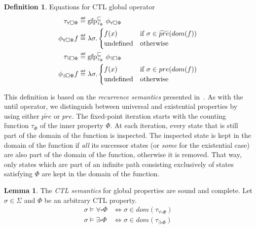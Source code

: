 \documentclass[11pt,a4paper,titlepage]{article}
\theoremstyle{definition}
\newtheorem{definition}{Definition}[section]
\newtheorem{lemma}[theorem]{Lemma}
\newcommand\eqdef{\mathrel{\overset{\makebox[0pt]{\mbox{\normalfont\tiny\sffamily def}}}{=}}}
\begin{document}
\begin{definition}\label{def:ctl_semantics_global}
    Equations for CTL global operator
    \setlength{\jot}{15pt}
    \begin{align}
        \tau_{\forall\square\Phi} &\eqdef \text{gfp}_{\tau_\Phi}^{\sqsubseteq} \  \phi_{\forall\square\Phi}\\
        \phi_{\forall\square\Phi}f &\eqdef \lambda \sigma.
        \begin{cases}
            f(x)                            & \text{if} \ \sigma \in \widetilde{pre}(dom(f)) \\
            \text{undefined}                & \text{otherwise}
        \end{cases}\\
        \tau_{\exists\square\Phi} &\eqdef \text{gfp}_{\tau_\Phi}^{\sqsubseteq} \  \phi_{\exists\square\Phi}\\
        \phi_{\exists\square\Phi}f &\eqdef \lambda \sigma.
        \begin{cases}
            f(x)                            & \text{if} \ \sigma \in pre(dom(f)) \\
            \text{undefined}                & \text{otherwise}
        \end{cases}
    \end{align}
\end{definition}

This definition is based on the \textit{recurrence semantics} presented in~\cite{UrbanM-VMCAI15}.
As with the \textsf{until} operator, we distinguish between universal and existential properties by using either $\widetilde{pre}$ or $pre$. 
The fixed-point iteration starts with the counting function $\tau_\Phi$ of the inner property $\Phi$.
At each iteration, every state that is still part of the domain of the function is inspected. 
The inspected state is kept in the domain of the function if \textit{all} its successor states 
(or \textit{some} for the existential case) are also part of the domain of the function, otherwise it is removed.
That way, only states which are part of an infinite path consisting exclusively of states satisfying $\Phi$ are kept in 
the domain of the function.

\begin{lemma}\label{lem:ctl_semantics_global}
    The \textit{CTL semantics} for \textsf{global} properties are sound and complete. 
    Let $\sigma \in \Sigma$ and $\Phi$ be an arbitrary CTL property.
    \begin{align}
        \sigma \models \forall\square\Phi &\iff \sigma \in dom(\tau_{\forall\square\Phi})\\
        \sigma \models \exists\square\Phi &\iff \sigma \in dom(\tau_{\exists\square\Phi})
    \end{align}
\end{lemma}
\end{document}

